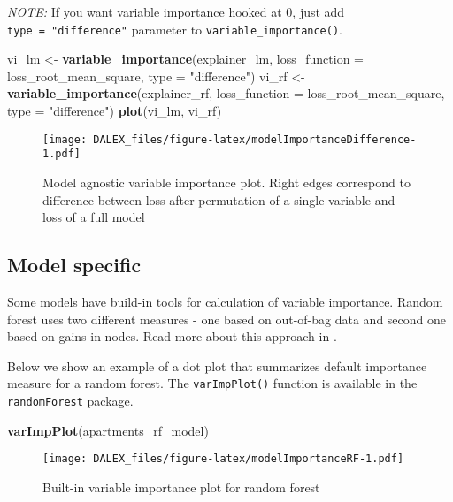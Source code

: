 \documentclass[]{book}
\newenvironment{Shaded}{\begin{snugshade}}{\end{snugshade}}
\newcommand{\DataTypeTok}[1]{\textcolor[rgb]{0.13,0.29,0.53}{#1}}
\newcommand{\KeywordTok}[1]{\textcolor[rgb]{0.13,0.29,0.53}{\textbf{#1}}}
\newcommand{\NormalTok}[1]{#1}
\newcommand{\StringTok}[1]{\textcolor[rgb]{0.31,0.60,0.02}{#1}}
\theoremstyle{definition}
\theoremstyle{definition}
\theoremstyle{definition}
\theoremstyle{remark}
\begin{document}
\emph{NOTE:} If you want variable importance hooked at 0, just add
\texttt{type\ =\ "difference"} parameter to
\texttt{variable\_importance()}.

\begin{Shaded}
\begin{Highlighting}[]
\NormalTok{vi_lm <-}\StringTok{ }\KeywordTok{variable_importance}\NormalTok{(explainer_lm, }\DataTypeTok{loss_function =}\NormalTok{ loss_root_mean_square, }\DataTypeTok{type =} \StringTok{"difference"}\NormalTok{)}
\NormalTok{vi_rf <-}\StringTok{ }\KeywordTok{variable_importance}\NormalTok{(explainer_rf, }\DataTypeTok{loss_function =}\NormalTok{ loss_root_mean_square, }\DataTypeTok{type =} \StringTok{"difference"}\NormalTok{)}
\KeywordTok{plot}\NormalTok{(vi_lm, vi_rf)}
\end{Highlighting}
\end{Shaded}

\begin{figure}
\centering
\texttt{[image: DALEX\_files/figure-latex/modelImportanceDifference-1.pdf]}
\caption{\label{fig:modelImportanceDifference}Model agnostic variable
importance plot. Right edges correspond to difference between loss after
permutation of a single variable and loss of a full model}
\end{figure}

\hypertarget{modelSpecific}{%
\subsection{Model specific}\label{modelSpecific}}

Some models have build-in tools for calculation of variable importance.
Random forest uses two different measures - one based on out-of-bag data
and second one based on gains in nodes. Read more about this approach in
\citep{randomForest}.

Below we show an example of a dot plot that summarizes default
importance measure for a random forest. The \texttt{varImpPlot()}
function is available in the \texttt{randomForest} package.

\begin{Shaded}
\begin{Highlighting}[]
\KeywordTok{varImpPlot}\NormalTok{(apartments_rf_model)}
\end{Highlighting}
\end{Shaded}

\begin{figure}
\centering
\texttt{[image: DALEX\_files/figure-latex/modelImportanceRF-1.pdf]}
\caption{\label{fig:modelImportanceRF}Built-in variable importance plot for
random forest}
\end{figure}
\end{document}
